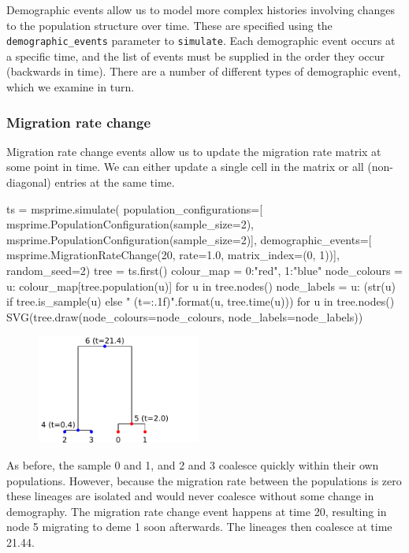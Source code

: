 \documentclass[graybox]{svmult}
\newcommand{\includenbimage}[1]{\begin{center}\texttt{[image: \#1]}\end{center}}
\begin{document}
Demographic events allow us to model more complex histories involving
changes to the population structure over time. These are specified using
the \texttt{demographic\_events} parameter to \texttt{simulate}. Each
demographic event occurs at a specific time, and the list of events must
be supplied in the order they occur (backwards in time). There are a
number of different types of demographic event, which we examine in
turn.

\subsubsection{Migration rate change}\label{migration-rate-change}

Migration rate change events allow us to update the migration rate
matrix at some point in time. We can either update a single cell in the
matrix or all (non-diagonal) entries at the same time.
\begin{pythoncode}
ts  = msprime.simulate(
    population_configurations=[
        msprime.PopulationConfiguration(sample_size=2),
        msprime.PopulationConfiguration(sample_size=2)],
    demographic_events=[
        msprime.MigrationRateChange(20, rate=1.0, matrix_index=(0, 1))],
    random_seed=2)
tree = ts.first()
colour_map = {0:"red", 1:"blue"}
node_colours = {u: colour_map[tree.population(u)] for u in tree.nodes()}
node_labels = {
    u: (str(u) if tree.is_sample(u) else "{} (t={:.1f})".format(u,
tree.time(u)))
    for u in tree.nodes()}
SVG(tree.draw(node_colours=node_colours, node_labels=node_labels))
\end{pythoncode}

\begin{figure}
  \begin{center}
    \includegraphics[width=0.48\textwidth]{images/simulations_34_0.pdf}
  \end{center}
\end{figure}

    As before, the sample 0 and 1, and 2 and 3 coalesce quickly within their
own populations. However, because the migration rate between the
populations is zero these lineages are isolated and would never coalesce
without some change in demography. The migration rate change event
happens at time 20, resulting in node 5 migrating to deme 1 soon
afterwards. The lineages then coalesce at time 21.44.
\end{document}
